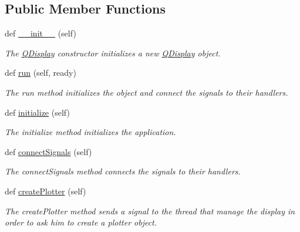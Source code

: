 \subsection*{Public Member Functions}
\begin{DoxyCompactItemize}
\item 
def \hyperlink{classDQN-Deepmind-NIPS-2013_1_1QtDisplay_1_1QDisplay_a4bf429fba1b45e555b41cac72f3d6f6a}{\+\_\+\+\_\+init\+\_\+\+\_\+} (self)
\begin{DoxyCompactList}\small\item\em The \hyperlink{classDQN-Deepmind-NIPS-2013_1_1QtDisplay_1_1QDisplay}{Q\+Display} constructor initializes a new \hyperlink{classDQN-Deepmind-NIPS-2013_1_1QtDisplay_1_1QDisplay}{Q\+Display} object. \end{DoxyCompactList}\item 
def \hyperlink{classDQN-Deepmind-NIPS-2013_1_1QtDisplay_1_1QDisplay_ae9c369b6776a7ca0805044f597be7cb2}{run} (self, ready)
\begin{DoxyCompactList}\small\item\em The run method initializes the object and connect the signals to their handlers. \end{DoxyCompactList}\item 
def \hyperlink{classDQN-Deepmind-NIPS-2013_1_1QtDisplay_1_1QDisplay_a12e947e8732fe3848a4746d4d3cf75c3}{initialize} (self)
\begin{DoxyCompactList}\small\item\em The initialize method initializes the application. \end{DoxyCompactList}\item 
def \hyperlink{classDQN-Deepmind-NIPS-2013_1_1QtDisplay_1_1QDisplay_ab3bca6243b3015a5bb26d0c00ba80d8f}{connect\+Signals} (self)
\begin{DoxyCompactList}\small\item\em The connect\+Signals method connects the signals to their handlers. \end{DoxyCompactList}\item 
def \hyperlink{classDQN-Deepmind-NIPS-2013_1_1QtDisplay_1_1QDisplay_adf1649fb26b3af16c155db2adf1275d2}{create\+Plotter} (self)
\begin{DoxyCompactList}\small\item\em The create\+Plotter method sends a signal to the thread that manage the display in order to ask him to create a plotter object. \end{DoxyCompactList}\item 

\end{DoxyCompactItemize}
